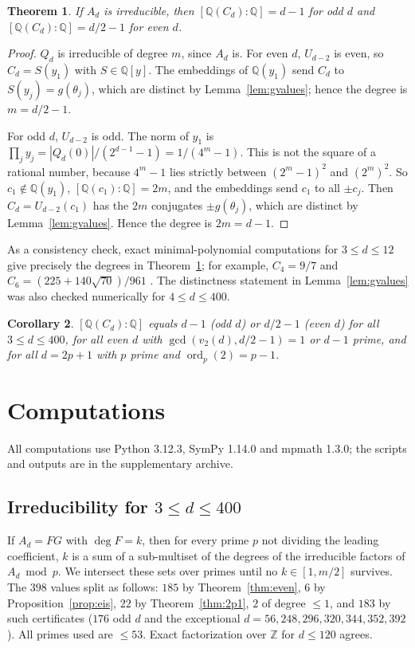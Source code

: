 \documentclass[11pt]{amsart}
\newtheorem{theorem}{Theorem}[section]\newtheorem{proposition}[theorem]{Proposition}\newtheorem{lemma}[theorem]{Lemma}
\newtheorem{corollary}[theorem]{Corollary}\newtheorem{conjecture}[theorem]{Conjecture}
\theoremstyle{definition}\newtheorem{definition}[theorem]{Definition}\newtheorem{example}[theorem]{Example}
\theoremstyle{remark}\newtheorem{remark}[theorem]{Remark}
\newcommand{\Q}{\mathbb Q}\newcommand{\Z}{\mathbb Z}\newcommand{\F}{\mathbb F}
\begin{document}
\begin{theorem}\label{thm:degree}
If $A_d$ is irreducible, then $[\Q(C_d):\Q]=d-1$ for odd $d$ and $[\Q(C_d):\Q]=d/2-1$ for even $d$.
\end{theorem}
\begin{proof}
$Q_d$ is irreducible of degree $m$, since $A_d$ is. For even $d$, $U_{d-2}$ is even, so $C_d=S(y_1)$ with $S\in\Q[y]$. The embeddings of $\Q(y_1)$ send
$C_d$ to $S(y_j)=g(\theta_j)$, which are distinct by Lemma~\ref{lem:gvalues}; hence the degree is $m=d/2-1$.

For odd $d$, $U_{d-2}$ is odd. The norm of $y_1$ is $\prod_jy_j=|Q_d(0)|/(2^{d-1}-1)=1/(4^m-1)$. This is not the square of a rational number,
because $4^m-1$ lies strictly between $(2^m-1)^2$ and $(2^m)^2$. So $c_1\notin\Q(y_1)$, $[\Q(c_1):\Q]=2m$, and the embeddings send $c_1$ to all
$\pm c_j$. Then $C_d=U_{d-2}(c_1)$ has the $2m$ conjugates $\pm g(\theta_j)$, which are distinct by Lemma~\ref{lem:gvalues}. Hence the degree is
$2m=d-1$.
\end{proof}
As a consistency check, exact minimal-polynomial computations for $3\le d\le12$ give precisely the degrees in Theorem~\ref{thm:degree};
for example, $C_4=9/7$ and $C_6=(225+140\sqrt{70})/961$ \cite[Cor.~5.1, Prop.~5.2]{I}.
The distinctness statement in Lemma~\ref{lem:gvalues} was also checked numerically for $4\le d\le400$.

\begin{corollary}\label{cor:degree}
$[\Q(C_d):\Q]$ equals $d-1$ (odd $d$) or $d/2-1$ (even $d$) for all $3\le d\le400$, for all even $d$ with $\gcd(v_2(d),d/2-1)=1$ or $d-1$ prime, and
for all $d=2p+1$ with $p$ prime and $\operatorname{ord}_p(2)=p-1$.
\end{corollary}

\section{Computations}\label{sec:comp}
All computations use Python 3.12.3, SymPy 1.14.0 and mpmath 1.3.0; the scripts and outputs are in the supplementary archive.

\subsection*{Irreducibility for $3\le d\le400$}
If $A_d=FG$ with $\deg F=k$, then for every prime $p$ not dividing the leading coefficient, $k$ is a sum of a sub-multiset of the degrees of the
irreducible factors of $A_d\bmod p$. We intersect these sets over primes until no $k\in[1,m/2]$ survives. The $398$ values split as follows:
$185$ by Theorem~\ref{thm:even}, $6$ by Proposition~\ref{prop:eis}, $22$ by Theorem~\ref{thm:2p1}, $2$ of degree $\le1$, and $183$ by such
certificates ($176$ odd $d$ and the exceptional $d=56,248,296,320,344,352,392$). All primes used are $\le53$. Exact factorization over $\Z$ for
$d\le120$ agrees.
\end{document}
